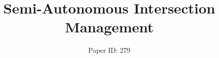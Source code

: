 \documentclass{aamas2014}
\begin{document}
\title{Semi-Autonomous Intersection Management}


\author{
%
\alignauthor
Paper ID: 279
}
\end{document}
